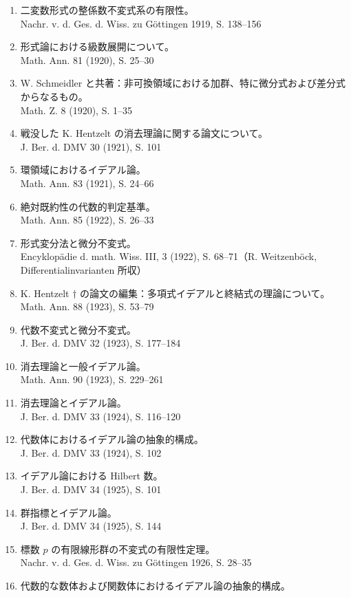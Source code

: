 \begin{enumerate}
J. Ber. d. DMV 28 (1919), S. 182--203
\item 二変数形式の整係数不変式系の有限性。\\
Nachr. v. d. Ges. d. Wiss. zu Göttingen 1919, S. 138--156
\item 形式論における級数展開について。\\
Math. Ann. 81 (1920), S. 25--30
\item W. Schmeidler と共著：非可換領域における加群、特に微分式および差分式からなるもの。\\
Math. Z. 8 (1920), S. 1--35
\item 戦没した K. Hentzelt の消去理論に関する論文について。\\
J. Ber. d. DMV 30 (1921), S. 101
\item 環領域におけるイデアル論。\\
Math. Ann. 83 (1921), S. 24--66
\item 絶対既約性の代数的判定基準。\\
Math. Ann. 85 (1922), S. 26--33
\item 形式変分法と微分不変式。\\
Encyklopädie d. math. Wiss. III, 3 (1922), S. 68--71（R. Weitzenböck, Differentialinvarianten 所収）
\item K. Hentzelt \(\dagger\) の論文の編集：多項式イデアルと終結式の理論について。\\
Math. Ann. 88 (1923), S. 53--79
\item 代数不変式と微分不変式。\\
J. Ber. d. DMV 32 (1923), S. 177--184
\item 消去理論と一般イデアル論。\\
Math. Ann. 90 (1923), S. 229--261
\item 消去理論とイデアル論。\\
J. Ber. d. DMV 33 (1924), S. 116--120
\item 代数体におけるイデアル論の抽象的構成。\\
J. Ber. d. DMV 33 (1924), S. 102
\item イデアル論における Hilbert 数。\\
J. Ber. d. DMV 34 (1925), S. 101
\item 群指標とイデアル論。\\
J. Ber. d. DMV 34 (1925), S. 144
\item 標数 \(p\) の有限線形群の不変式の有限性定理。\\
Nachr. v. d. Ges. d. Wiss. zu Göttingen 1926, S. 28--35
\item 代数的な数体および関数体におけるイデアル論の抽象的構成。\\

\end{enumerate}
